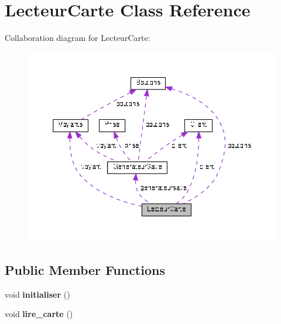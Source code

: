 \hypertarget{classLecteurCarte}{}\section{Lecteur\+Carte Class Reference}
\label{classLecteurCarte}


Collaboration diagram for Lecteur\+Carte\+:
\nopagebreak
\begin{figure}[H]
\begin{center}
\leavevmode
\includegraphics[width=350pt]{classLecteurCarte__coll__graph}
\end{center}
\end{figure}
\subsection*{Public Member Functions}
\begin{DoxyCompactItemize}
\item 
\mbox{\label{classLecteurCarte_a723859d389df0d286a553d39ec77a11f}} 
void {\bfseries initialiser} ()
\item 
\mbox{\label{classLecteurCarte_a90e4f75fb492935ebaf5f908173763af}} 
void {\bfseries lire\+\_\+carte} ()
\end{DoxyCompactItemize}
